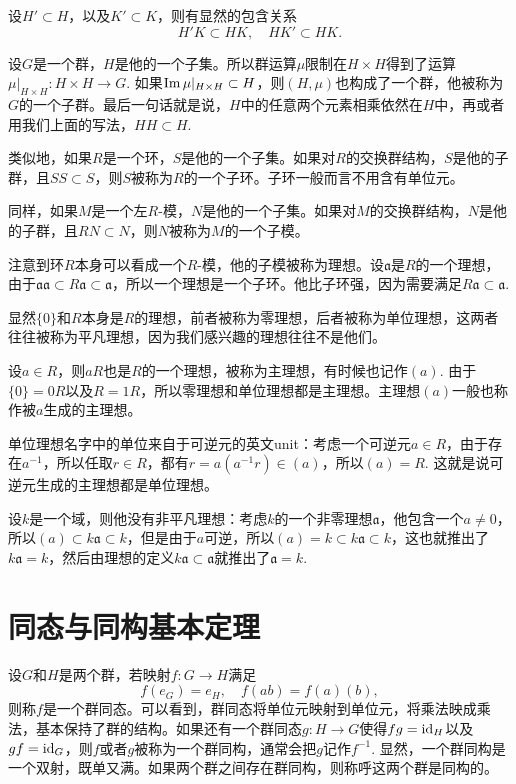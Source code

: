 设$H'\subset H$，以及$K'\subset K$，则有显然的包含关系
\[
	H'K\subset HK,\quad HK'\subset HK.
\]

\para 设$G$是一个群，$H$是他的一个子集。所以群运算$\mu$限制在$H\times H$得到了运算$\mu|_{H\times H}:H\times H\to G$. 如果$\operatorname{Im}\mu|_{H\times H}\subset H$，则$(H,\mu)$也构成了一个群，他被称为$G$的一个子群。最后一句话就是说，$H$中的任意两个元素相乘依然在$H$中，再或者用我们上面的写法，$HH\subset H$.

类似地，如果$R$是一个环，$S$是他的一个子集。如果对$R$的交换群结构，$S$是他的子群，且$SS\subset S$，则$S$被称为$R$的一个子环。子环一般而言不用含有单位元。

同样，如果$M$是一个左$R$-模，$N$是他的一个子集。如果对$M$的交换群结构，$N$是他的子群，且$RN\subset N$，则$N$被称为$M$的一个子模。

\para 注意到环$R$本身可以看成一个$R$-模，他的子模被称为理想。设$\mathfrak{a}$是$R$的一个理想，由于$\mathfrak{a}\mathfrak{a}\subset R\mathfrak{a}\subset \mathfrak{a}$，所以一个理想是一个子环。他比子环强，因为需要满足$R\mathfrak{a}\subset \mathfrak{a}$.

显然$\{0\}$和$R$本身是$R$的理想，前者被称为零理想，后者被称为单位理想，这两者往往被称为平凡理想，因为我们感兴趣的理想往往不是他们。

设$a\in R$，则$aR$也是$R$的一个理想，被称为主理想，有时候也记作$(a)$. 由于$\{0\}=0R$以及$R=1R$，所以零理想和单位理想都是主理想。主理想$(a)$一般也称作被$a$生成的主理想。

单位理想名字中的单位来自于可逆元的英文unit：考虑一个可逆元$a\in R$，由于存在$a^{-1}$，所以任取$r\in R$，都有$r=a(a^{-1}r)\in (a)$，所以$(a)=R$. 这就是说可逆元生成的主理想都是单位理想。

设$k$是一个域，则他没有非平凡理想：考虑$k$的一个非零理想$\mathfrak{a}$，他包含一个$a\neq 0$，所以$(a)\subset k\mathfrak{a} \subset k$，但是由于$a$可逆，所以$(a)=k\subset k\mathfrak{a} \subset k$，这也就推出了$k\mathfrak{a}=k$，然后由理想的定义$k\mathfrak{a}\subset \mathfrak{a}$就推出了$\mathfrak{a}=k$.

\section{同态与同构基本定理}

\para 设$G$和$H$是两个群，若映射$f:G\to H$满足
\[
	f(e_G)=e_H,\quad f(ab)=f(a)(b),
\]
则称$f$是一个群同态。可以看到，群同态将单位元映射到单位元，将乘法映成乘法，基本保持了群的结构。如果还有一个群同态$g:H\to G$使得$fg=\operatorname{id}_H$以及$gf=\operatorname{id}_G$，则$f$或者$g$被称为一个群同构，通常会把$g$记作$f^{-1}$. 显然，一个群同构是一个双射，既单又满。如果两个群之间存在群同构，则称呼这两个群是同构的。

